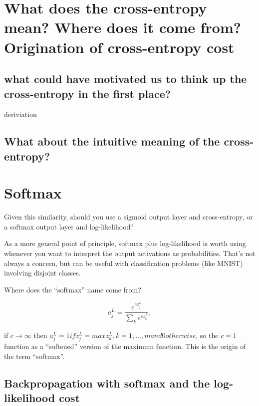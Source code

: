 \documentclass[]{book}
\begin{document}
\section{What does the cross-entropy mean? Where does it come from?
Origination of cross-entropy
cost}\label{what-does-the-cross-entropy-mean-where-does-it-come-from-origination-of-cross-entropy-cost}

\subsection{\texorpdfstring{what could have \textbf{motivated} us to
think up the cross-entropy in the first
place?}{what could have motivated us to think up the cross-entropy in the first place?}}\label{what-could-have-motivated-us-to-think-up-the-cross-entropy-in-the-first-place}

deriviation

\subsection{What about the intuitive meaning of the
cross-entropy?}\label{what-about-the-intuitive-meaning-of-the-cross-entropy}

\section{Softmax}\label{softmax}

Given this similarity, should you use a sigmoid output layer and
cross-entropy, or a softmax output layer and log-likelihood?

As a more general point of principle, softmax plus log-likelihood is
worth using whenever you want to interpret the output activations as
probabilities. That's not always a concern, but can be useful with
classification problems (like MNIST) involving disjoint classes.

Where does the ``softmax'' name come from?

\begin{equation}
a^L_j = \frac{e^{c z^L_j}}{\sum_k e^{c z^L_k}},
\end{equation}

if \(c \rightarrow \infty\) then
\(a^L_j = 1 if z^L_j = max{z^L_k, k = 1, \ldots, m} and 0 otherwise\),
so the \(c = 1\) function as a ``softened'' version of the maximum
function. This is the origin of the term ``softmax''.

\subsection{Backpropagation with softmax and the log-likelihood
cost}\label{backpropagation-with-softmax-and-the-log-likelihood-cost}
\end{document}
